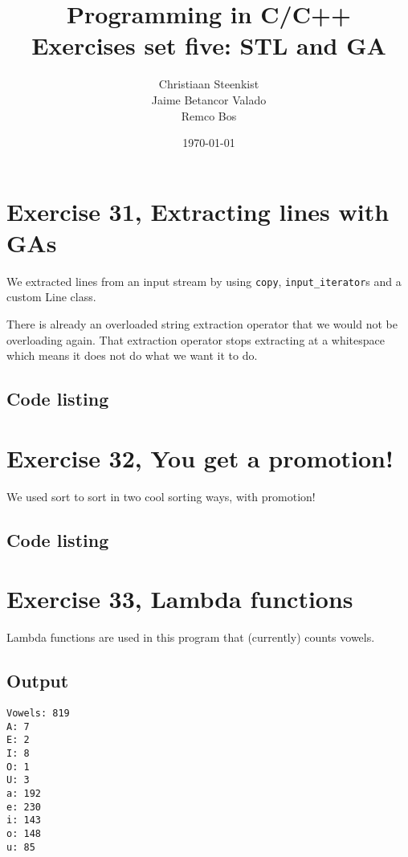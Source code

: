 \documentclass[11pt]{article}
\begin{document}
\title{Programming in C/C++ \\
       Exercises set five: STL and GA
}
\date{\today}
\author{Christiaan Steenkist \\
Jaime Betancor Valado \\
Remco Bos \\
}

\maketitle

\section*{Exercise 31, Extracting lines with GAs}
We extracted lines from an input stream by using \texttt{copy}, \texttt{input\_iterator}s and a custom Line class.

There is already an overloaded string extraction operator that we would not be overloading again.
That extraction operator stops extracting at a whitespace which means it does not do what we want it to do.

\subsection*{Code listing}


\section*{Exercise 32, You get a promotion!}
We used sort to sort in two cool sorting ways, with promotion!

\subsection*{Code listing}


\section*{Exercise 33, Lambda functions}
Lambda functions are used in this program that (currently) counts vowels.

\subsection*{Output}
\begin{lstlisting}
Vowels: 819
A: 7
E: 2
I: 8
O: 1
U: 3
a: 192
e: 230
i: 143
o: 148
u: 85
\end{lstlisting}
\end{document}
